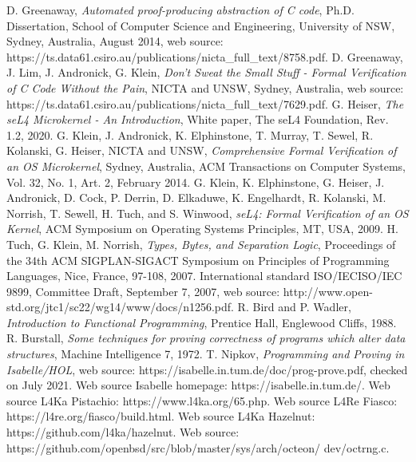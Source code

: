 \documentclass[conference]{IEEEtran}
\begin{document}
\begin{thebibliography}{20}
 D. Greenaway, \textit{Automated proof-producing abstraction of C code},  Ph.D. Dissertation, School of Computer Science and Engineering, University of NSW, Sydney, Australia, August 2014, web source: https://ts.data61.csiro.au/publications/nicta\_full\_text/8758.pdf.
  D. Greenaway, J. Lim, J. Andronick, G. Klein, \textit{Don’t Sweat the Small Stuff - Formal Verification of C Code Without the Pain}, NICTA and UNSW, Sydney, Australia, web source: https://ts.data61.csiro.au/publications/nicta\_full\_text/7629.pdf.
 G. Heiser, \textit{The seL4 Microkernel - An Introduction}, White paper, The seL4 Foundation, Rev. 1.2, 2020.
 G. Klein, J. Andronick, K. Elphinstone, T. Murray, T. Sewel, R. Kolanski, G. Heiser, NICTA and UNSW, \textit{Comprehensive Formal Verification of an OS Microkernel}, Sydney, Australia, ACM Transactions on Computer Systems, Vol. 32, No. 1, Art. 2, February 2014.
 G. Klein, K. Elphinstone, G. Heiser, J. Andronick, D. Cock, P. Derrin, D. Elkaduwe, K. Engelhardt, R. Kolanski, M. Norrish, T. Sewell, H. Tuch, and S. Winwood, \textit{seL4: Formal Verification of an OS Kernel}, ACM Symposium on Operating Systems Principles, MT, USA, 2009.
 H. Tuch, G. Klein, M. Norrish, \textit{Types, Bytes, and Separation Logic}, Proceedings of the 34th ACM SIGPLAN-SIGACT Symposium on Principles of Programming Languages, Nice, France, 97-108, 2007.
 International standard ISO/IECISO/IEC 9899, Committee Draft,  September 7, 2007, web source: http://www.open-std.org/jtc1/sc22/wg14/www/docs/n1256.pdf.
 R. Bird and P. Wadler, \textit{Introduction to Functional Programming}, Prentice Hall, Englewood Cliffs, 1988.
 R. Burstall, \textit{Some techniques for proving correctness of programs which alter data structures}, Machine Intelligence 7, 1972.
 T. Nipkov, \textit{Programming and Proving in Isabelle/HOL}, web source:  https://isabelle.in.tum.de/doc/prog-prove.pdf, checked on July 2021.
 Web source Isabelle homepage: https://isabelle.in.tum.de/.
 Web source L4Ka Pistachio: https://www.l4ka.org/65.php.
 Web source L4Re Fiasco: https://l4re.org/fiasco/build.html.
 Web source L4Ka Hazelnut: https://github.com/l4ka/hazelnut. 
 Web source: https://github.com/openbsd/src/blob/master/sys/arch/octeon/ dev/octrng.c.
\end{thebibliography}
\end{document}

